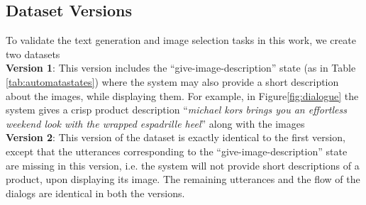 \documentclass[letterpaper]{article} %
\begin{document}
\iffalse
\subsubsection{Discussion}
\label{subsec:discussion}

Note that for evaluating the image response in selection/ranking mode (as described in the previous section), a system would also need negative training and test examples alongside the correct ones. %
 Negative examples are generated by either sampling an item from the wrong fashion category (e.g. shoe in place of a bag) or a wrong sub-category of the target item (e.g a backpack in place of a sachel bag) or items violating certain attribute criteria provided by the user.
 \fi

\subsection{Dataset Versions}
\label{subsec:dataset_versions}
To validate the text generation and image selection tasks in this work, we create two datasets\\
\noindent\textbf{Version 1}: This version includes the ``give-image-description'' state (as in Table \ref{tab:automatastates}) where the system may also provide a short description about the images, while displaying them. For example, in Figure\ref{fig:dialogue} the system gives a crisp product description ``\emph{michael kors brings you an effortless weekend look with the wrapped espadrille heel}'' along with the images\\
\noindent\textbf{Version 2}: This version of the dataset is exactly identical to the first version, except that the utterances corresponding to the ``give-image-description'' state are missing in this version, i.e. the system will not provide short descriptions of a product, upon displaying its image. The remaining utterances and the flow of the dialogs are identical in both the versions.
\end{document}
